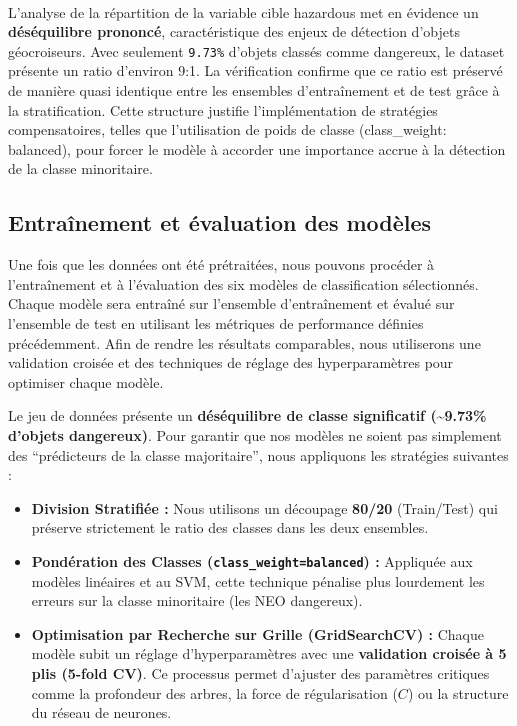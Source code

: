 \documentclass[11pt]{article}
\providecommand{\tightlist}{%
      \setlength{\itemsep}{0pt}\setlength{\parskip}{0pt}}
\begin{document}
\begin{center}
\end{center}
{ \hspace*{\fill} \\}

L'analyse de la répartition de la variable cible hazardous met en
évidence un \textbf{déséquilibre prononcé}, caractéristique des enjeux
de détection d'objets géocroiseurs. Avec seulement \texttt{9.73\%}
d'objets classés comme dangereux, le dataset présente un ratio d'environ
9:1. La vérification confirme que ce ratio est préservé de manière quasi
identique entre les ensembles d'entraînement et de test grâce à la
stratification. Cette structure justifie l'implémentation de stratégies
compensatoires, telles que l'utilisation de poids de classe
(class\_weight: balanced), pour forcer le modèle à accorder une
importance accrue à la détection de la classe minoritaire.

\subsection{Entraînement et évaluation des
  modèles}\label{entrauxeenement-et-uxe9valuation-des-moduxe8les}

Une fois que les données ont été prétraitées, nous pouvons procéder à
l'entraînement et à l'évaluation des six modèles de classification
sélectionnés. Chaque modèle sera entraîné sur l'ensemble d'entraînement
et évalué sur l'ensemble de test en utilisant les métriques de
performance définies précédemment. Afin de rendre les résultats
comparables, nous utiliserons une validation croisée et des techniques
de réglage des hyperparamètres pour optimiser chaque modèle.

Le jeu de données présente un \textbf{déséquilibre de classe
  significatif (\textasciitilde9.73\% d'objets dangereux)}. Pour garantir
que nos modèles ne soient pas simplement des ``prédicteurs de la classe
majoritaire'', nous appliquons les stratégies suivantes :

\begin{itemize}
  \tightlist
  \item
        \textbf{Division Stratifiée :} Nous utilisons un découpage
        \textbf{80/20} (Train/Test) qui préserve strictement le ratio des
        classes dans les deux ensembles.
  \item
        \textbf{Pondération des Classes
          (\texttt{class\_weight=\textquotesingle{}balanced\textquotesingle{}})
          :} Appliquée aux modèles linéaires et au SVM, cette technique pénalise
        plus lourdement les erreurs sur la classe minoritaire (les NEO
        dangereux).
  \item
        \textbf{Optimisation par Recherche sur Grille (GridSearchCV) :} Chaque
        modèle subit un réglage d'hyperparamètres avec une \textbf{validation
          croisée à 5 plis (5-fold CV)}. Ce processus permet d'ajuster des
        paramètres critiques comme la profondeur des arbres, la force de
        régularisation (\(C\)) ou la structure du réseau de neurones.
\end{itemize}
\end{document}
